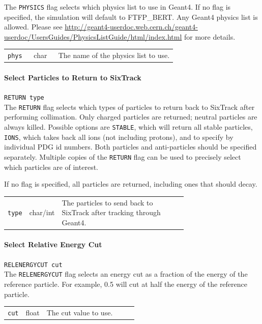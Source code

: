 The \texttt{PHYSICS} flag selects which physics list to use in Geant4.
If no flag is specified, the simulation will default to FTFP\_BERT.
Any Geant4 physics list is allowed.
Please see \url{http://geant4-userdoc.web.cern.ch/geant4-userdoc/UsersGuides/PhysicsListGuide/html/index.html} for more details.

\bigskip
\begin{tabular}{@{}llp{0.7\linewidth}}
    \texttt{phys} & char    & The name of the physics list to use.
\end{tabular}

\paragraph{Select Particles to Return to SixTrack} \texttt{RETURN type}\\

The \texttt{RETURN} flag selects which types of particles to return back to SixTrack after performing collimation.
Only charged particles are returned; neutral particles are always killed.
Possible options are \texttt{STABLE}, which will return all stable particles, \texttt{IONS}, which takes back all ions (not including protons), and to specify by individual PDG id numbers.
Both particles and anti-particles should be specified separately.
Multiple copies of the \texttt{RETURN} flag can be used to precisely select which particles are of interest.

If no flag is specified, all particles are returned, including ones that should decay.

\bigskip
\begin{tabular}{@{}llp{0.7\linewidth}}
    \texttt{type} & char/int & The particles to send back to SixTrack after tracking through Geant4.
\end{tabular}

\paragraph{Select Relative Energy Cut} \texttt{RELENERGYCUT cut}\\

The \texttt{RELENERGYCUT} flag selects an energy cut as a fraction of the energy of the reference particle.
For example, 0.5 will cut at half the energy of the reference particle.

\bigskip
\begin{tabular}{@{}llp{0.7\linewidth}}
    \texttt{cut} & float    & The cut value to use.
\end{tabular}


